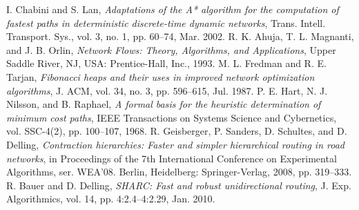 \documentclass[conference]{IEEEtran}
\begin{document}
\begin{thebibliography}{99}
 I. Chabini and S. Lan, {\it Adaptations of the A* algorithm for the computation of fastest paths in deterministic discrete-time dynamic networks}, Trans. Intell. Transport. Sys., vol. 3, no. 1, pp. 60–74, Mar. 2002.
 R. K. Ahuja, T. L. Magnanti, and J. B. Orlin, {\it Network Flows: Theory, Algorithms, and Applications}, Upper Saddle River, NJ, USA: Prentice-Hall, Inc., 1993.
 M. L. Fredman and R. E. Tarjan, {\it Fibonacci heaps and their uses in improved network optimization algorithms}, J. ACM, vol. 34, no. 3, pp. 596–615, Jul. 1987.
 P. E. Hart, N. J. Nilsson, and B. Raphael, {\it A formal basis for the heuristic determination of minimum cost paths}, IEEE Transactions on Systems Science and Cybernetics, vol. SSC-4(2), pp. 100–107, 1968.
 R. Geisberger, P. Sanders, D. Schultes, and D. Delling, {\it Contraction hierarchies: Faster and simpler hierarchical routing in road networks}, in Proceedings of the 7th International Conference on Experimental Algorithms, ser. WEA’08. Berlin, Heidelberg: Springer-Verlag, 2008, pp. 319–333.
 R. Bauer and D. Delling, {\it SHARC: Fast and robust unidirectional routing}, J. Exp. Algorithmics, vol. 14, pp. 4:2.4–4:2.29, Jan. 2010.
\end{thebibliography}
\end{document}
